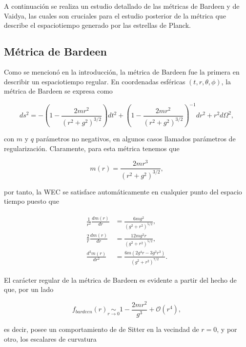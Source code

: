 \documentclass{article}
\numberwithin{equation}{section}
\theoremstyle{definition}
\begin{document}
A continuación se realiza un estudio detallado de las métricas de Bardeen y de Vaidya, las cuales son cruciales para el estudio posterior de la métrica que describe el espaciotiempo generado por las estrellas de Planck.

\subsection{\label{bardeen section} Métrica de Bardeen}

Como se mencionó en la introducción, la métrica de Bardeen \cite{bardeen} fue la primera en describir un espaciotiempo regular. En coordenadas esféricas $(t,r,\theta,\phi)$, la métrica de Bardeen se expresa como

\begin{equation}
\label{bardeen metric}
ds^2 = -\left( 1 - \frac{2mr^2}{(r^2 + g^2)^{3/2}} \right)dt^2 + \left( 1 - \frac{2mr^2}{(r^2 + g^2)^{3/2}} \right)^{-1}dr^2 + r^2d\Omega^2,
\end{equation}

con $m$ y $q$ parámetros no negativos, en algunos casos llamados parámetros de regularización. Claramente, para esta métrica tenemos que 

\begin{equation}
m(r) = \frac{2mr^3}{(r^2 + g^2)^{3/2}},
\end{equation}

por tanto, la WEC se satisface automáticamente en cualquier punto del espacio tiempo puesto que 

\begin{align}
\begin{aligned}
\frac{1}{r^2}\frac{dm(r)}{dr} &= \frac{6 m g^2}{\left(g^2+r^2\right)^{5/2}},\\
\frac{2}{r}\frac{dm(r)}{dr} &= \frac{12 m g^2 r}{\left(g^2+r^2\right)^{5/2}},\\
\frac{d^2m(r)}{dr^2} &= \frac{6 m \left(2 g^4 r-3 g^2 r^3\right)}{\left(g^2+r^2\right)^{7/2}}.
\end{aligned}
\end{align}

El carácter regular de la métrica de Bardeen es evidente a partir del hecho de que, por un lado

\begin{equation}
f_{bardeen}(r) \underset{r \to 0}{\sim} 1 - \frac{2mr^2}{g^3} + \mathcal{O}(r^4),
\end{equation}

es decir, posee un comportamiento de de Sitter en la vecindad de $r = 0$, y por otro, los escalares de curvatura
\end{document}
